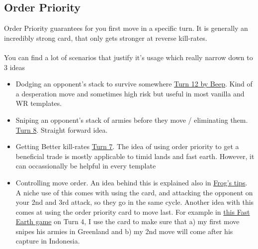 \subsection{Order Priority}

Order Priority guarantees for you first move in a specific turn. It is generally an incredibly strong card, that only gets stronger at reverse kill-rates. 
\\
\\
You can find a lot of scenarios that justify it's usage which really narrow down to 3 ideas
\begin{itemize}
    \item Dodging an opponent's stack to survive somewhere \href{https://www.warzone.com/MultiPlayer?GameID=21225771}{Turn 12 by Beep}. Kind of a desperation move and sometimes high risk but useful in most vanilla and WR templates.
    \item Sniping an opponent's stack of armies before they move / eliminating them. \href{https://www.warzone.com/MultiPlayer?GameID=33424922}{Turn 8}. Straight forward idea.
    \item Getting Better kill-rates \href{https://www.warzone.com/MultiPlayer?GameID=31218324}{Turn 7}. The idea of using order priority to get a beneficial trade is mostly applicable to timid lands and fast earth. However, it can occassionally be helpful in every template
    \item Controlling move order. An idea behind this is explained also in \href{https://www.warzone.com/Forum/149405-trans-attc-percentage-cards?Offset=0}{Frog's tips}. A niche use of this comes with using the card, and attacking the opponent on your 2nd and 3rd attack, so they go in the same cycle. Another idea with this comes at using the order priority card to move last. For example in \href{https://www.warzone.com/MultiPlayer?GameID=37803798}{this Fast Earth game} on Turn 4, I use the card to make sure that a) my first move snipes his armies in Greenland and b) my 2nd move will come after his capture in Indonesia.
\end{itemize}

